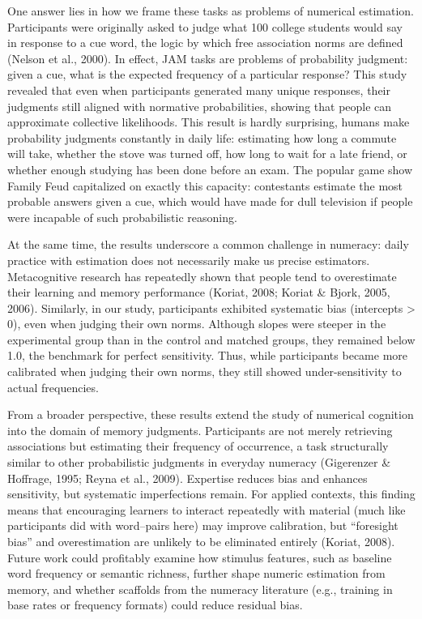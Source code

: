 \documentclass[
  man,floatsintext]{apa7}
\begin{document}
One answer lies in how we frame these tasks as problems of numerical
estimation. Participants were originally asked to judge what 100 college
students would say in response to a cue word, the logic by which free
association norms are defined (Nelson et al., 2000). In effect, JAM tasks are
problems of probability judgment: given a cue, what is the expected
frequency of a particular response? This study revealed that even when
participants generated many unique responses, their judgments still
aligned with normative probabilities, showing that people can
approximate collective likelihoods. This result is hardly surprising,
humans make probability judgments constantly in daily life: estimating
how long a commute will take, whether the stove was turned off, how long
to wait for a late friend, or whether enough studying has been done
before an exam. The popular game show Family Feud capitalized on exactly
this capacity: contestants estimate the most probable answers given a
cue, which would have made for dull television if people were incapable
of such probabilistic reasoning.

At the same time, the results underscore a common challenge in numeracy:
daily practice with estimation does not necessarily make us precise
estimators. Metacognitive research has repeatedly shown that people tend
to overestimate their learning and memory performance (Koriat, 2008; Koriat \& Bjork, 2005, 2006). Similarly, in our study, participants
exhibited systematic bias (intercepts \textgreater{} 0), even when judging their own
norms. Although slopes were steeper in the experimental group than in
the control and matched groups, they remained below 1.0, the benchmark
for perfect sensitivity. Thus, while participants became more calibrated
when judging their own norms, they still showed under-sensitivity to
actual frequencies.

From a broader perspective, these results extend the study of numerical
cognition into the domain of memory judgments. Participants are not
merely retrieving associations but estimating their frequency of
occurrence, a task structurally similar to other probabilistic judgments
in everyday numeracy (Gigerenzer \& Hoffrage, 1995; Reyna et al., 2009). Expertise reduces
bias and enhances sensitivity, but systematic imperfections remain. For
applied contexts, this finding means that encouraging learners to
interact repeatedly with material (much like participants did with
word--pairs here) may improve calibration, but ``foresight bias'' and
overestimation are unlikely to be eliminated entirely (Koriat, 2008).
Future work could profitably examine how stimulus features, such as
baseline word frequency or semantic richness, further shape numeric
estimation from memory, and whether scaffolds from the numeracy
literature (e.g., training in base rates or frequency formats) could
reduce residual bias.
\end{document}
